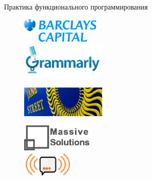 \documentclass{beamer}
\begin{document}
\begin{frame}{Практика функционального программирования}
  \begin{figure}[h]
    \begin{minipage}[h]{0.49\linewidth}
      \begin{center}
        \includegraphics[height=12mm]{lecture0/Barcap-logo.eps}
      \end{center}
    \end{minipage}
    \begin{minipage}[h]{0.49\linewidth}
      \begin{center}
        \includegraphics[height=18mm]{lecture0/logo_grammarly.eps}
      \end{center}
    \end{minipage}
  \end{figure}
  \begin{figure}
    \includegraphics[height=15mm]{lecture0/janestreet.eps}
  \end{figure}
  \begin{figure}[h]
    \begin{minipage}[h]{0.49\linewidth}
      \begin{center}
        \includegraphics[height=13mm]{lecture0/Massive_Solutions.eps}
      \end{center}
    \end{minipage}
    \begin{minipage}[h]{0.49\linewidth}
      \begin{center}
        \includegraphics[height=13mm]{lecture0/Socialabs.eps}
      \end{center}
    \end{minipage}
  \end{figure}
\end{frame}
\end{document}

